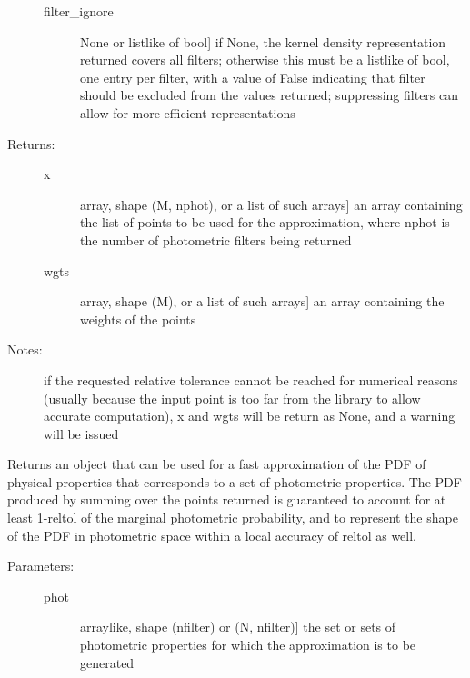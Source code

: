 \documentclass[letterpaper,10pt,english]{sphinxmanual}
\begin{document}
\begin{fulllineitems}
\begin{fulllineitems}
\begin{description}
\begin{description}
\item[{filter\_ignore}] \leavevmode{[}None or listlike of bool{]}
if None, the kernel density representation returned
covers all filters; otherwise this must be a listlike of
bool, one entry per filter, with a value of False
indicating that filter should be excluded from the
values returned; suppressing filters can allow for more
efficient representations

\end{description}

\item[{Returns:}] \leavevmode\begin{description}
\item[{x}] \leavevmode{[}array, shape (M, nphot), or a list of such arrays{]}
an array containing the list of points to be used for
the approximation, where nphot is the number of
photometric filters being returned

\item[{wgts}] \leavevmode{[}array, shape (M), or a list of such arrays{]}
an array containing the weights of the points

\end{description}

\item[{Notes:}] \leavevmode
if the requested relative tolerance cannot be reached for
numerical reasons (usually because the input point is too
far from the library to allow accurate computation), x and
wgts will be return as None, and a warning will be issued

\end{description}

\end{fulllineitems}


\begin{fulllineitems}
\label{\detokenize{bayesphot:slugpy.bayesphot.bp.bp.make_approx_phys}}
Returns an object that can be used for a fast approximation of
the PDF of physical properties that corresponds to a set of
photometric properties. The PDF produced by summing over the
points returned is guaranteed to account for at least 1-reltol
of the marginal photometric probability, and to represent the
shape of the PDF in photometric space within a local accuracy
of reltol as well.
\begin{description}
\item[{Parameters:}] \leavevmode\begin{description}
\item[{phot}] \leavevmode{[}arraylike, shape (nfilter) or (N, nfilter){]}
the set or sets of photometric properties for which the
approximation is to be generated


\end{description}
\end{description}
\end{fulllineitems}
\end{fulllineitems}
\end{document}
